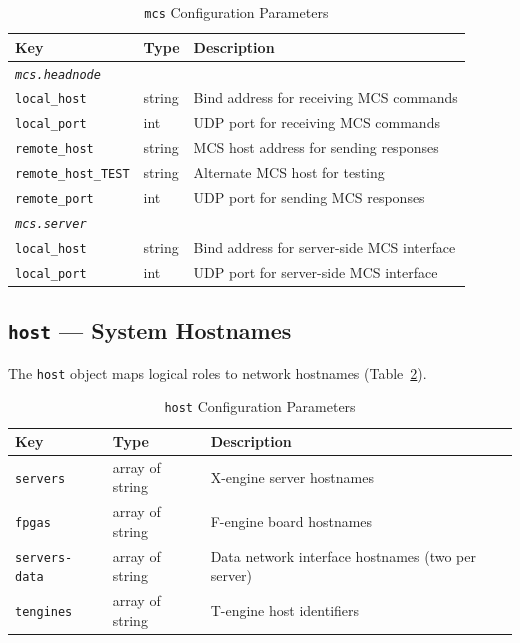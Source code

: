 \begin{table}[htbp]
    \centering
    \caption{\texttt{mcs} Configuration Parameters}
    \label{tab:config-mcs}
    \begin{tabular}{llp{7cm}}
        \toprule
        \textbf{Key} & \textbf{Type} & \textbf{Description} \\
        \midrule
        \multicolumn{3}{l}{\textit{\texttt{mcs.headnode}}} \\
        \quad\texttt{local\_host}       & string & Bind address for receiving MCS commands \\
        \quad\texttt{local\_port}       & int    & UDP port for receiving MCS commands \\
        \quad\texttt{remote\_host}      & string & MCS host address for sending responses \\
        \quad\texttt{remote\_host\_TEST}& string & Alternate MCS host for testing \\
        \quad\texttt{remote\_port}      & int    & UDP port for sending MCS responses \\
        \midrule
        \multicolumn{3}{l}{\textit{\texttt{mcs.server}}} \\
        \quad\texttt{local\_host}       & string & Bind address for server-side MCS interface \\
        \quad\texttt{local\_port}       & int    & UDP port for server-side MCS interface \\
        \bottomrule
    \end{tabular}
\end{table}

\subsection{\texttt{host} --- System Hostnames}

The \texttt{host} object maps logical roles to network hostnames (Table~\ref{tab:config-host}).

\begin{table}[htbp]
    \centering
    \caption{\texttt{host} Configuration Parameters}
    \label{tab:config-host}
    \begin{tabular}{llp{7cm}}
        \toprule
        \textbf{Key} & \textbf{Type} & \textbf{Description} \\
        \midrule
        \texttt{servers}      & array of string & X-engine server hostnames \\
        \texttt{fpgas}        & array of string & F-engine board hostnames \\
        \texttt{servers-data} & array of string & Data network interface hostnames (two per server) \\
        \texttt{tengines}     & array of string & T-engine host identifiers \\
        \bottomrule
    \end{tabular}
\end{table}

